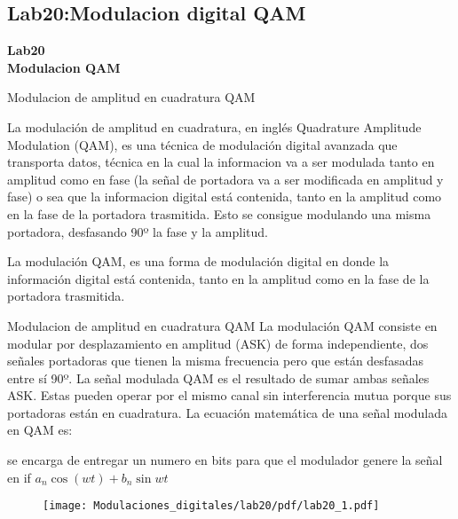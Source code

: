 \subsection{Lab20:Modulacion digital QAM}

\begin{frame}{}


\bfseries{\textrm{\LARGE Lab20\\ \Large Modulacion QAM}}
\raggedright
\end{frame}

\begin{frame}{Modulacion de amplitud en cuadratura QAM}
\begin{flushleft}
La modulación de amplitud en cuadratura, en inglés Quadrature Amplitude Modulation (QAM), es una técnica de modulación digital avanzada que transporta datos, técnica en la cual la informacion va a ser modulada tanto en amplitud como en fase (la señal de portadora va a ser modificada en amplitud y fase) o sea que la informacion digital está contenida, tanto en la amplitud como en la fase de la portadora trasmitida. Esto se consigue modulando una misma portadora, desfasando 90º la fase y la amplitud.
\end{flushleft}

La modulación QAM, es una forma de modulación digital en donde la información digital está contenida, tanto en la amplitud como en la fase de la portadora trasmitida.
\end{frame}

\begin{frame}{Modulacion de amplitud en cuadratura QAM}
La modulación QAM consiste en modular por desplazamiento en amplitud (ASK) de forma independiente, dos señales portadoras que tienen la misma frecuencia pero que están desfasadas entre sí 90º. La señal modulada QAM es el resultado de sumar ambas señales ASK. Estas pueden operar por el mismo canal sin interferencia mutua porque sus portadoras están en cuadratura. La ecuación matemática de una señal modulada en QAM es:


se encarga de entregar un numero en bits para que el modulador genere la señal en if
${ a }_{ n }\cos { (wt) } +b_{ n }\sin { wt } $
 

\begin{figure}[H]
\centering
\texttt{[image: Modulaciones\_digitales/lab20/pdf/lab20\_1.pdf]}
\end{figure}
\end{frame}

